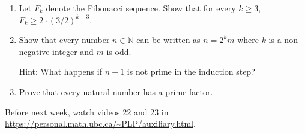 \documentclass[12pt]{article}
\begin{document}
\begin{enumerate}[resume]
\item 
Let $F_k$ denote the Fibonacci sequence. Show that for every $k \geq 3$, $F_k \geq 2\cdot (3/2)^{k-3}$.


\item Show that every number $n\in \mathbb N$ can be written as $n=2^km$ where $k$ is a non-negative integer and $m$ is odd.

Hint: What happens if $n+1$ is not prime in the induction step?

\item Prove that every natural number has a prime factor.


\end{enumerate}

Before next week, watch videos 22 and 23 in \url{https://personal.math.ubc.ca/~PLP/auxiliary.html}.
\end{document}
